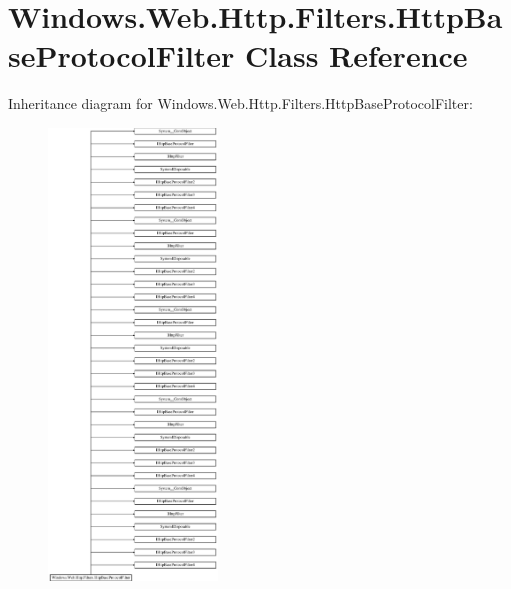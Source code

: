 \hypertarget{class_windows_1_1_web_1_1_http_1_1_filters_1_1_http_base_protocol_filter}{}\section{Windows.\+Web.\+Http.\+Filters.\+Http\+Base\+Protocol\+Filter Class Reference}
\label{class_windows_1_1_web_1_1_http_1_1_filters_1_1_http_base_protocol_filter}
Inheritance diagram for Windows.\+Web.\+Http.\+Filters.\+Http\+Base\+Protocol\+Filter\+:\begin{figure}[H]
\begin{center}
\leavevmode
\includegraphics[height=12.000000cm]{class_windows_1_1_web_1_1_http_1_1_filters_1_1_http_base_protocol_filter}
\end{center}
\end{figure}
